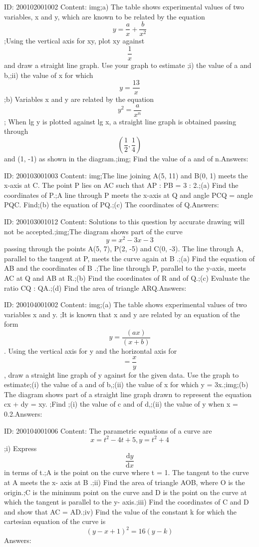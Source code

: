 \documentclass{article}
\begin{document}
ID: 200102001002
Content:
img;a) The table shows experimental values of two variables, x and y, which are known to be related by the equation \[y=\frac{a}{x}+\frac{b}{x^{2}}\];Using the vertical axis for xy, plot xy against \[\frac{1}{x}\] and draw a straight line graph. Use your graph to estimate ;i) the value of a and b,;ii) the value of x for which \[y=\frac{13}{x}\];b) Variables x and y are related by the equation \[y^2=\frac{a}{x^{n}}\]; When lg y is plotted against lg x, a straight line graph is obtained passing through \[(\frac{1}{2},\frac{1}{4})\] and (1, -1) as shown in the diagram.;img; Find the value of a and of n.Answers:

ID: 200103001003
Content:
img;The line joining A(5, 11) and B(0, 1) meets the x-axis at C. The point P lies on AC such that AP : PB = 3 : 2.;(a)	Find the coordinates of P.;A line through P meets the x-axis at Q and angle PCQ = angle PQC. Find;(b)	the equation of PQ.;(c)	The coordinates of Q.Answers:

ID: 200103001012
Content:
Solutions to this question by accurate drawing will not be accepted.;img;The diagram shows part of the curve \[y=x^2-3x-3\] passing through the points A(5, 7), P(2, -5) and C(0, -3). The line through A, parallel to the tangent at P, meets the curve again at B .;(a)	Find the equation of AB and the coordinates of B .;The line through P, parallel to the y-axis, meets AC at Q and AB at R.;(b)	Find the coordinates of R and of Q.;(c)	Evaluate the ratio CQ : QA.;(d)	Find the area of triangle ARQ.Answers:

ID: 200104001002
Content:
img;(a)	The table shows experimental values of two variables x and y. ;It is known that x and y are related by an equation of the form $$y=\frac{(ax)}{(x+b)}$$. Using the vertical axis for y and the horizontal axis for $$=\frac{x}{y}$$, draw a straight line graph of y against for the given data. Use the graph to estimate;(i)	the value of a and of b,;(ii)	the value of x for which y = 3x.;img;(b)	The diagram shows part of a straight line graph drawn to represent the equation cx + dy = xy. ;Find ;(i)	the value of c and of d,;(ii)	the value of y when x = 0.2.Answers:

ID: 200104001006
Content:
The parametric equations of a curve are $$x=t^2-4t+5, y=t^2+4$$;i) Express $$\frac{\mathrm{d} y}{\mathrm{d} x}$$ in terms of t.;A is the point on the curve where t = 1. The tangent to the curve at A meets the x- axis at B .;ii) Find the area of triangle AOB, where O is the origin.;C is the minimum point on the curve and D is the point on the curve at which the tangent is parallel to the y- axis.;iii) Find the coordinates of C and D and show that AC = AD.;iv) Find the value of the constant k for which the cartesian equation of the curve is $$(y-x+1)^2=16(y-k)$$Answers:
\end{document}
